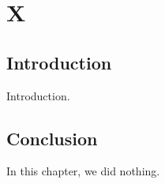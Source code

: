 \renewcommand\thechapter{\Roman{chapter}}
\chapter{X}
\newpage
\section*{Introduction}

Introduction.

\section*{Conclusion}

In this chapter, we did nothing.